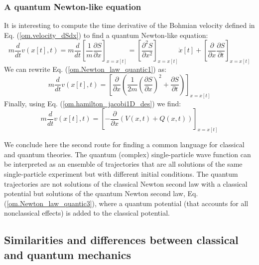 \documentclass[onecolumn,nofootinbib, secnumarabic, amsmath, nobibnotes,12pt,aps,pra]{revtex4-1}
\newcommand{\eref}[1]{Eq. (\ref{#1})}
\begin{document}
\subsubsection{A quantum Newton-like equation}

It is interesting to compute the time derivative of the Bohmian velocity defined in \eref{om.velocity_dSdx} to find a quantum Newton-like equation:
\begin{equation}
\label{om.Newton_law_quantic1}
m\frac {d} {dt} v(x[t],t)\! =\! m \frac {d} {dt} \left[ \frac{1}{m} \frac {\partial S} {\partial x} \right]_{x = x[t]} \!=\! \left[ \frac {\partial^2 S} {\partial x^2}\right]_{x = x[t]} \dot{x}[t] + \left[\frac {\partial} {\partial x} \frac {\partial S} {\partial t} \right]_{x = x[t]}
\end{equation}
We can rewrite \eref{om.Newton_law_quantic1} as:
\begin{equation}
\label{om.Newton_law_quantic2}
m\frac {d} {dt} v(x[t],t) = \left[ \frac {\partial} {\partial x} \left(\frac {1} {2m} \left(\frac {\partial S} {\partial x} \right)^{2} + \frac {\partial S} {\partial t} \right) \right]_{x = x[t]}
\end{equation}
Finally, using \eref{om.hamilton_jacobi1D_des} we find:
\begin{equation}
\label{om.Newton_law_quantic3}
m\frac {d} {dt} v(x[t],t) = \left[ -\frac {\partial} {\partial x} \left(V(x,t) + Q(x,t) \right) \right]_{x = x[t]}
\end{equation}

We conclude here the second route for finding a common language for
classical and quantum theories. The quantum (complex)
single-particle wave function can be interpreted as an ensemble of
trajectories that are all solutions of the same single-particle
experiment but with different initial conditions. The quantum
trajectories are not solutions of the classical Newton second  law with a
classical potential but solutions of the quantum Newton second law,
\eref{om.Newton_law_quantic3}, where a quantum potential (that
accounts for all nonclassical effects) is added to the classical
potential.

\subsection{Similarities and differences between classical and quantum mechanics}\label{om.sec_single.4}
\end{document}
